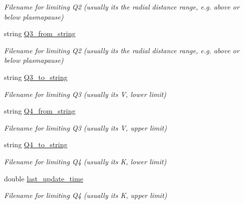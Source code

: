 \begin{DoxyCompactItemize}
\begin{DoxyCompactList}\small\item\em Filename for limiting Q2 (usually it\textquotesingle{}s the radial distance range, e.\+g. above or below plasmapause) \end{DoxyCompactList}\item 
\hypertarget{class_updatable_matrix_a1ea1c233ed77177f662e406ad0ad8d1b}{}string \hyperlink{class_updatable_matrix_a1ea1c233ed77177f662e406ad0ad8d1b}{Q3\+\_\+from\+\_\+string}\label{class_updatable_matrix_a1ea1c233ed77177f662e406ad0ad8d1b}

\begin{DoxyCompactList}\small\item\em Filename for limiting Q2 (usually it\textquotesingle{}s the radial distance range, e.\+g. above or below plasmapause) \end{DoxyCompactList}\item 
\hypertarget{class_updatable_matrix_a9a31ee7fd00632594c8b34dbe9596d67}{}string \hyperlink{class_updatable_matrix_a9a31ee7fd00632594c8b34dbe9596d67}{Q3\+\_\+to\+\_\+string}\label{class_updatable_matrix_a9a31ee7fd00632594c8b34dbe9596d67}

\begin{DoxyCompactList}\small\item\em Filename for limiting Q3 (usually it\textquotesingle{}s V, lower limit) \end{DoxyCompactList}\item 
\hypertarget{class_updatable_matrix_a447bb6290fb58483a6cb7b6a97a6426d}{}string \hyperlink{class_updatable_matrix_a447bb6290fb58483a6cb7b6a97a6426d}{Q4\+\_\+from\+\_\+string}\label{class_updatable_matrix_a447bb6290fb58483a6cb7b6a97a6426d}

\begin{DoxyCompactList}\small\item\em Filename for limiting Q3 (usually it\textquotesingle{}s V, upper limit) \end{DoxyCompactList}\item 
\hypertarget{class_updatable_matrix_ae9b01bb02376078fa32378cd4e3622b3}{}string \hyperlink{class_updatable_matrix_ae9b01bb02376078fa32378cd4e3622b3}{Q4\+\_\+to\+\_\+string}\label{class_updatable_matrix_ae9b01bb02376078fa32378cd4e3622b3}

\begin{DoxyCompactList}\small\item\em Filename for limiting Q4 (usually it\textquotesingle{}s K, lower limit) \end{DoxyCompactList}\item 
\hypertarget{class_updatable_matrix_a9002d11dd833b30678db3d6dbefcb0e0}{}double \hyperlink{class_updatable_matrix_a9002d11dd833b30678db3d6dbefcb0e0}{last\+\_\+update\+\_\+time}\label{class_updatable_matrix_a9002d11dd833b30678db3d6dbefcb0e0}

\begin{DoxyCompactList}\small\item\em Filename for limiting Q4 (usually it\textquotesingle{}s K, upper limit) \end{DoxyCompactList}\end{DoxyCompactItemize}



